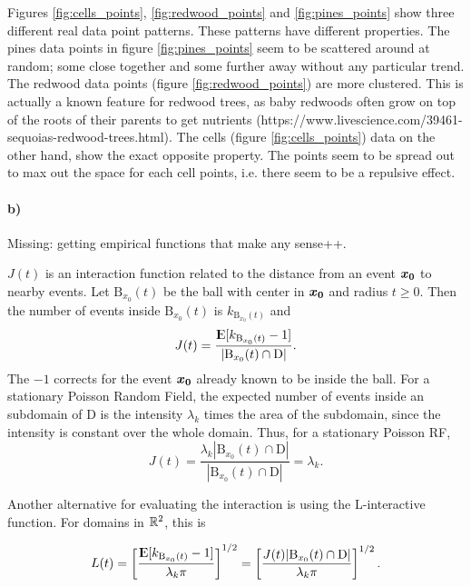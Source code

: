 Figures \ref{fig:cells_points}, \ref{fig:redwood_points} and \ref{fig:pines_points} show three different real data point patterns. These patterns have different properties. The pines data points in figure \ref{fig:pines_points} seem to be scattered around at random; some close together and some further away without any particular trend. The redwood data points (figure \ref{fig:redwood_points}) are more clustered. This is actually a known feature for redwood trees, as baby redwoods often grow on top of the roots of their parents to get nutrients (https://www.livescience.com/39461-sequoias-redwood-trees.html). The cells (figure \ref{fig:cells_points}) data on the other hand, show the exact opposite property. The points seem to be spread out to max out the space for each cell points, i.e. there seem to be a repulsive effect.

\paragraph{b)} Missing: getting empirical functions that make any sense++.

$J(t)$ is an interaction function related to the distance from an event $\bm{x_0}$ to nearby events. Let $\textrm{B}_{x_0}(t)$ be the ball with center in $\bm{x_0}$ and radius $t \geq 0$. Then the number of events inside $\textrm{B}_{x_0}(t)$ is $k_{\textrm{B}_{x_0}(t)}$ and
\begin{equation}
    J(t) = \frac{{\rm I\kern-.3em E}{[k_{\textrm{B}_{x_0}(t)}-1]}}{|\textrm{B}_{x_0}(t) \cap \textrm{D}|}.
\end{equation}
The $-1$ corrects for the event $\bm{x_0}$ already known to be inside the ball. For a stationary Poisson Random Field, the expected number of events inside an subdomain of D is the intensity $\lambda_k$ times the area of the subdomain, since the intensity is constant over the whole domain. Thus, for a stationary Poisson RF, 
\begin{equation}
    J(t) = \frac{\lambda_k |\textrm{B}_{x_0}(t) \cap \textrm{D}|}{|\textrm{B}_{x_0}(t) \cap \textrm{D}|} = \lambda_k.
\end{equation}

Another alternative for evaluating the interaction is using the L-interactive function. For domains in $\mathbb{R}^2$, this is

\begin{equation}
    L(t) = \left[\frac{{\rm I\kern-.3em E}{[k_{\textrm{B}_{x_0}(t)}-1]}}{\lambda_k \pi}\right]^{1/2} = \left[\frac{J(t)|\textrm{B}_{x_0}(t) \cap \textrm{D}|}{\lambda_k \pi}\right]^{1/2}.
\end{equation}

